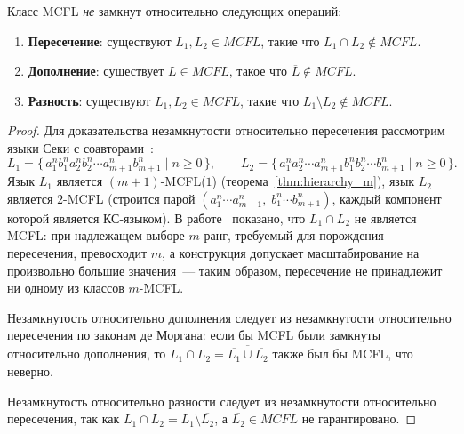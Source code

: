 \begin{theorem}
    \label{thm:mcf_nonclosure}
    Класс MCFL \emph{не} замкнут относительно следующих операций:
    \begin{enumerate}
        \item \textbf{Пересечение}: существуют $L_1, L_2 \in MCFL$, такие что $L_1 \cap L_2 \notin MCFL$.
        \item \textbf{Дополнение}: существует $L \in MCFL$, такое что $\overline{L} \notin MCFL$.
        \item \textbf{Разность}: существуют $L_1, L_2 \in MCFL$, такие что $L_1 \setminus L_2 \notin MCFL$.
    \end{enumerate}
\end{theorem}

\begin{proof}
    Для доказательства незамкнутости относительно пересечения рассмотрим языки Секи с соавторами~:
    \[
    L_1 = \{\,a_1^n b_1^n a_2^n b_2^n \cdots a_{m+1}^n b_{m+1}^n \mid n \ge 0\,\}, \qquad
    L_2 = \{\,a_1^n a_2^n \cdots a_{m+1}^n b_1^n b_2^n \cdots b_{m+1}^n \mid n \ge 0\,\}.
    \]
    Язык $L_1$ является $(m+1)$-MCFL($1$) (теорема~\ref{thm:hierarchy_m}), язык $L_2$ является $2$-MCFL (строится парой $(a_1^n\cdots a_{m+1}^n,\; b_1^n\cdots b_{m+1}^n)$, каждый компонент которой является КС-языком).
    В работе~ показано, что $L_1 \cap L_2$ не является MCFL: при надлежащем выборе $m$ ранг, требуемый для порождения пересечения, превосходит $m$, а конструкция допускает масштабирование на произвольно большие значения~--- таким образом, пересечение не принадлежит ни одному из классов $m$-MCFL.

    Незамкнутость относительно дополнения следует из незамкнутости относительно пересечения по законам де Моргана:
    если бы MCFL были замкнуты относительно дополнения, то $L_1 \cap L_2 = \overline{\overline{L_1} \cup \overline{L_2}}$ также был бы MCFL, что неверно.

    Незамкнутость относительно разности следует из незамкнутости относительно пересечения, так как $L_1 \cap L_2 = L_1 \setminus \overline{L_2}$, а $\overline{L_2} \in MCFL$ не гарантировано.
\end{proof}
